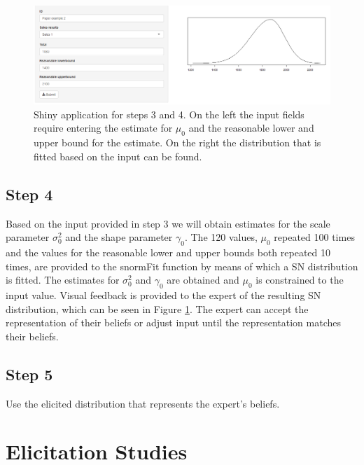 \documentclass[openright,titlepage,12pt,a4paper]{book}
\begin{document}
\begin{figure}

{\centering \includegraphics[width=0.9\linewidth]{figures/chapter_2/Figure_3} 

}

\caption{Shiny application for steps 3 and 4. On the left the input fields require entering the estimate for $\mu_0$ and the reasonable lower and upper bound for the estimate. On the right the distribution that is fitted based on the input can be found.}\label{fig:ch02fig3}
\end{figure}

\hypertarget{step-4}{%
\subsection{Step 4}\label{step-4}}

Based on the input provided in step 3 we will obtain estimates for the scale parameter \(\sigma^2_0\) and the shape parameter \(\gamma_0\). The 120 values, \(\mu_0\) repeated 100 times and the values for the reasonable lower and upper bounds both repeated 10 times, are provided to the snormFit function by means of which a SN distribution is fitted. The estimates for \(\sigma^2_0\) and \(\gamma_0\) are obtained and \(\mu_0\) is constrained to the input value. Visual feedback is provided to the expert of the resulting SN distribution, which can be seen in Figure \ref{fig:ch02fig3}. The expert can accept the representation of their beliefs or adjust input until the representation matches their beliefs.

\hypertarget{step-5}{%
\subsection{Step 5}\label{step-5}}

Use the elicited distribution that represents the expert's beliefs.

\hypertarget{elicitation-studies}{%
\section{Elicitation Studies}\label{elicitation-studies}}
\end{document}
